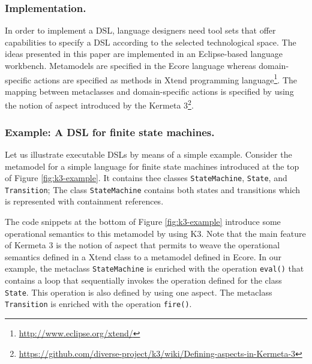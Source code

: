 \subsubsection{Implementation.} In order to implement a DSL, language designers need tool sets that offer capabilities to specify a DSL according to the selected technological space. The ideas presented in this paper are implemented in an Eclipse-based language workbench. Metamodels are specified in the Ecore language whereas domain-specific actions are specified as methods in Xtend programming language\footnote{\url{http://www.eclipse.org/xtend/}}. The mapping between metaclasses and domain-specific actions is specified by using the notion of aspect introduced by the Kermeta 3\footnote{\url{https://github.com/diverse-project/k3/wiki/Defining-aspects-in-Kermeta-3}}. 

\vspace{-3mm}
\subsubsection{Example: A DSL for finite state machines.} Let us illustrate executable DSLs by means of a simple example. Consider the metamodel for a simple language for finite state machines introduced at the top of Figure \ref{fig:k3-example}. It contains thee classes \texttt{StateMachine}, \texttt{State}, and \texttt{Transition}; The class \texttt{StateMachine} contains both states and transitions which is represented with containment references.

The code snippets at the bottom of Figure \ref{fig:k3-example} introduce some operational semantics to this metamodel by using K3. Note that the main feature of Kermeta 3 is the notion of aspect that permits to weave the operational semantics defined in a Xtend class to a metamodel defined in Ecore. In our example, the metaclass \texttt{StateMachine} is enriched with the operation \texttt{eval()} that contains a loop that sequentially invokes the operation defined for the class \texttt{State}. This operation is also defined by using one aspect. The metaclass \texttt{Transition} is enriched with the operation \texttt{fire()}.

